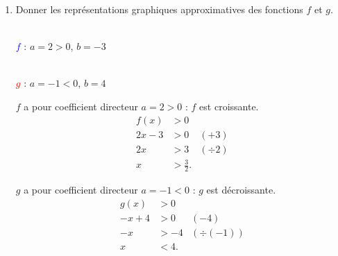 \documentclass[10pt,a4paper]{article}
\begin{document}
\begin{enumerate}
\item Donner les représentations graphiques approximatives des fonctions \(f\) et \(g\).

\begin{center}
\begin{minipage}{2.6cm}
\centering
{}\\[2pt]
{\scriptsize \textcolor{blue}{\(f\)} : \(a=2>0\), \(b=-3\)}
\end{minipage}
\hspace{0.3cm}
\begin{minipage}{2.6cm}
\centering
{}\\[2pt]
{\scriptsize \textcolor{red}{\(g\)} : \(a=-1<0\), \(b=4\)}
\end{minipage}
\end{center}

\begin{center}
\begin{minipage}{0.48\linewidth}
\(f\) a pour coefficient directeur \(a=2>0\) : \(f\) est croissante.
\[
\begin{aligned}
f(x)&>0\\
2x-3&>0 &\scriptstyle(+3)\\
2x&>3 &\scriptstyle(\div 2)\\
x&>\frac{3}{2}.
\end{aligned}
\]
\end{minipage}
\hfill
\begin{minipage}{0.48\linewidth}
\(g\) a pour coefficient directeur \(a=-1<0\) : \(g\) est décroissante.
\[
\begin{aligned}
g(x)&>0\\
-x+4&>0 &\scriptstyle(-4)\\
-x&>-4 &\scriptstyle(\div(-1))\\
x&<4.
\end{aligned}
\]
\end{minipage}
\end{center}


\end{enumerate}
\end{document}
